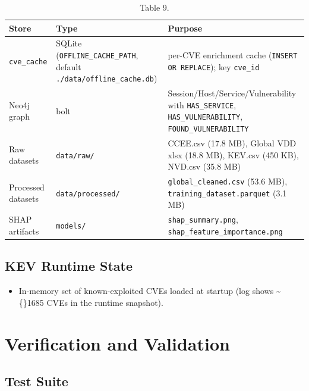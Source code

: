 \documentclass[10pt,journal,onecolumn]{IEEEtran}
\begin{document}
\begin{table}[h]
\caption{Table 9.}
\label{tab:t9}
\begin{tabularx}{\columnwidth}{l >{\raggedright\arraybackslash}X >{\raggedright\arraybackslash}X}
\toprule
\textbf{Store} & \textbf{Type} & \textbf{Purpose}\\
\midrule
\texttt{cve\_cache} & SQLite (\texttt{OFFLINE\_CACHE\_PATH}, default \texttt{./data/offline\_cache.db}) & per-CVE enrichment cache (\texttt{INSERT OR REPLACE}); key \texttt{cve\_id}\\
Neo4j graph & bolt & Session/Host/Service/Vulnerability with \texttt{HAS\_SERVICE}, \texttt{HAS\_VULNERABILITY}, \texttt{FOUND\_VULNERABILITY}\\
Raw datasets & \texttt{data/raw/} & CCEE.csv (17.8 MB), Global VDD xlsx (18.8 MB), KEV.csv (450 KB), NVD.csv (35.8 MB)\\
Processed datasets & \texttt{data/processed/} & \texttt{global\_cleaned.csv} (53.6 MB), \texttt{training\_\allowbreak dataset.\allowbreak parquet} (3.1 MB)\\
SHAP artifacts & \texttt{models/} & \texttt{shap\_summary.png}, \texttt{shap\_\allowbreak feature\_\allowbreak importance.\allowbreak png}\\
\bottomrule
\end{tabularx}
\end{table}

\subsection{KEV Runtime State}

\begin{itemize}
\item In-memory set of known-exploited CVEs loaded at startup (log shows \textasciitilde\{\}1685 CVEs in the runtime snapshot).
\end{itemize}

\section{Verification and Validation}

\subsection{Test Suite}
\end{document}

